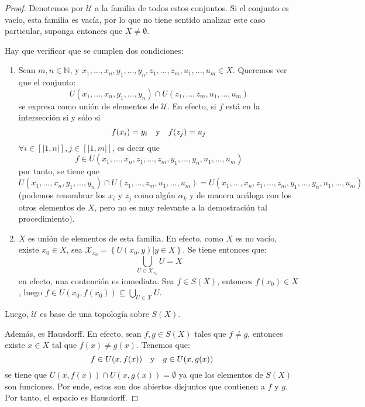 \documentclass[12pt]{report}
\theoremstyle{largebreak}
\newcommand{\natint}[1]{\ensuremath{\left[\big|#1\big|\right]}}
\begin{document}
    \begin{proof}
        Denotemos por $\mathcal{U}$ a la familia de todos estos conjuntos. Si el conjunto es vacío, esta familia es vacía, por lo que no tiene sentido analizar este caso particular, suponga entonces que $X\neq\emptyset$.

        Hay que verificar que se cumplen dos condiciones:
        \begin{enumerate}
            \item Sean $m,n\in\mathbb{N}$, y $x_1,...,x_n,y_1,...,y_n,z_1,...,z_m,u_1,...,u_m\in X$. Queremos ver que el conjunto:
            \begin{equation*}
                U(x_1,...,x_n,y_1,...,y_n)\cap U(z_1,...,z_m,u_1,...,u_m)
            \end{equation*}
            se expresa como unión de elementos de $\mathcal{U}$. En efecto, si $f$ está en la intersección si y sólo si
            \begin{equation*}
                f(x_i)=y_i\quad\textup{y}\quad f(z_j)=u_j
            \end{equation*}
            $\forall i\in\natint{1,n},j\in\natint{1,m}$, es decir que
            \begin{equation*}
                f\in U(x_1,...,x_n,z_1,...,z_m,y_1,...,y_n,u_1,...,u_m)
            \end{equation*}
            por tanto, se tiene que
            \begin{equation*}
                U(x_1,...,x_n,y_1,...,y_n)\cap U(z_1,...,z_m,u_1,...,u_m)=U(x_1,...,x_n,z_1,...,z_m,y_1,...,y_n,u_1,...,u_m)
            \end{equation*}
            (podemos renombrar los $x_i$ y $z_j$ como algún $\alpha_k$ y de manera análoga con los otros elementos de $X$, pero no es muy relevante a la demostración tal procedimiento).
            
            \item $X$ es unión de elementos de esta familia. En efecto, como $X$ es no vacío, existe $x_0\in X$, sea $\mathcal{X}_{x_0}=\left\{U(x_0,y)\Big|y\in X \right\}$. Se tiene entonces que:
            \begin{equation*}
                \bigcup_{U\in \mathcal{X}_{x_0}}U=X
            \end{equation*}
            en efecto, una contención es inmediata. Sea $f\in S(X)$, entonces $f(x_0)\in X$, luego $f\in U(x_0,f(x_0))\subseteq \bigcup_{U\in \mathcal{X}}U$.
        \end{enumerate}
        Luego, $\mathcal{U}$ es base de una topología sobre $S(X)$.

        Además, es Hausdorff. En efecto, sean $f,g\in S(X)$ tales que $f\neq g$, entonces existe $x\in X$ tal que $f(x)\neq g(x)$. Tenemos que:
        \begin{equation*}
            f\in U(x,f(x))\quad\textup{y}\quad g\in U(x,g(x))
        \end{equation*}
        se tiene que $U(x,f(x))\cap U(x,g(x))=\emptyset$ ya que los elementos de $S(X)$ son funciones. Por ende, estos son dos abiertos disjuntos que contienen a $f$ y $g$. Por tanto, el espacio es Hausdorff.
    \end{proof}
\end{document}
